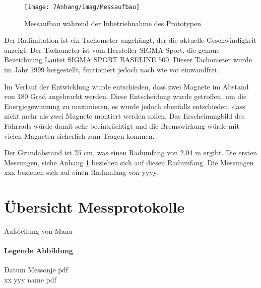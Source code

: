 \begin{figure}[ht]
    \texttt{[image: 7Anhang/imag/Messaufbau]}
	\caption{Messaufbau während der Inbetriebnahme des Prototypen}
	\label{messaufbau_anhang}
\end{figure}

Der Radimitation ist ein Tachometer angehängt, der die aktuelle Geschwindigkeit anzeigt. Der Tachometer ist vom Hersteller SIGMA Sport, die genaue Bezeichnung Lautet SIGMA SPORT BASELINE 500. Dieser Tachometer wurde im Jahr 1999 hergestellt, funtioniert jedoch nach wie vor einwandfrei.

Im Verlauf der Entwicklung wurde entschieden, dass zwei Magnete im Abstand von 180 Grad angebracht werden. Diese Entscheidung wurde getroffen, um die Energiegewinnung zu maximieren, es wurde jedoch ebenfalls entschieden, dass nicht mehr als zwei Magnete montiert werden sollen. Das Erscheinungbild des Fahrrads würde damit sehr beeinträchtigt und die Bremswirkung würde mit vielen Magneten sicherlich zum Tragen kommen.

Der Grundabstand ist 25 cm, was einen Radumfang von 2.04 m ergibt. Die ersten Messungen, siehe Anhang \ref{uebersicht_messprotokolle} beziehen sich auf diesen Radumfang. Die Messungen xxx beziehen sich auf einen Radumfang von yyyy.

\chapter{Übersicht Messprotokolle}
\label{uebersicht_messprotokolle}

Aufstellung von Manu

\subsubsection*{Legende Abbildung  }
\label{bla}
\begin{tabbing}
       Datum     \quad\= Messonje    \quad\= pdf     \\[0.8ex]
       xx \> yyy \> name pdf\\
   
\end{tabbing}  





